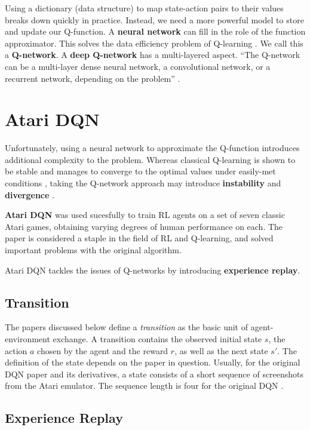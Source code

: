 Using a dictionary (data structure) to map state-action pairs to their values breaks down quickly in practice.
Instead, we need a more powerful model to store and update our Q-function.
A \textbf{neural network} can fill in the role of the function approximator.
This solves the data efficiency problem of Q-learning \cite{long-peak-rl}.
We call this a \textbf{Q-network}.
A \textbf{deep Q-network} has a multi-layered aspect.
``The Q-network can be a multi-layer dense neural network, a convolutional network, or a recurrent network, depending on the problem'' \cite{long-peak-rl}.

\section{Atari DQN}

Unfortunately, using a neural network to approximate the Q-function introduces additional complexity to the problem.
Whereas classical Q-learning is shown to be stable and manages to converge to the optimal values under easily-met conditions \cite{atari-dqn},
taking the Q-network approach may introduce \textbf{instability} and \textbf{divergence} \cite{long-peak-rl}.

\textbf{Atari DQN} \cite{atari-dqn} was used sucesfully to train RL agents on a set of seven classic Atari games, obtaining varying degrees of human performance on each.
The paper is considered a staple in the field of RL and Q-learning, and solved important problems with the original algorithm.

Atari DQN tackles the issues of Q-networks by introducing 
\textbf{experience replay}.

\subsection{Transition}

The papers discussed below define a \emph{transition} as the basic unit of agent-environment exchange.
A transition contains the observed initial state \(s\), the action \(a\) chosen by the agent and the reward \(r\), as well as the next state \(s'\). The definition of the state depends on the paper in question.
Usually, for the original DQN paper and its derivatives, a state consists of a short sequence of screenshots from the Atari emulator. The sequence length is four for the original DQN \cite{atari-dqn}.

\subsection{Experience Replay}

